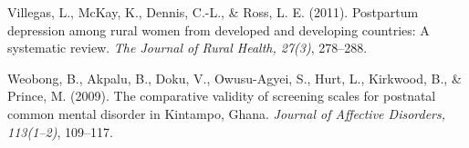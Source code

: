 \documentclass[man,natbib,longtable]{apa6}\usepackage[]{graphicx}\usepackage[]{color}
\begin{document}
{\vspace{0.25cm}

Villegas, L., McKay, K., Dennis, C.-L., \& Ross, L. E. (2011). Postpartum depression among rural women from developed and developing countries: A systematic review. \textit{The Journal of Rural Health, 27(3)}, 278--288.

\vspace{0.25cm}

Weobong, B., Akpalu, B., Doku, V., Owusu-Agyei, S., Hurt, L., Kirkwood, B., \& Prince, M. (2009). The comparative validity of screening scales for postnatal common mental disorder in Kintampo, Ghana. \textit{Journal of Affective Disorders, 113(1–2)}, 109--117.

}
\end{document}
